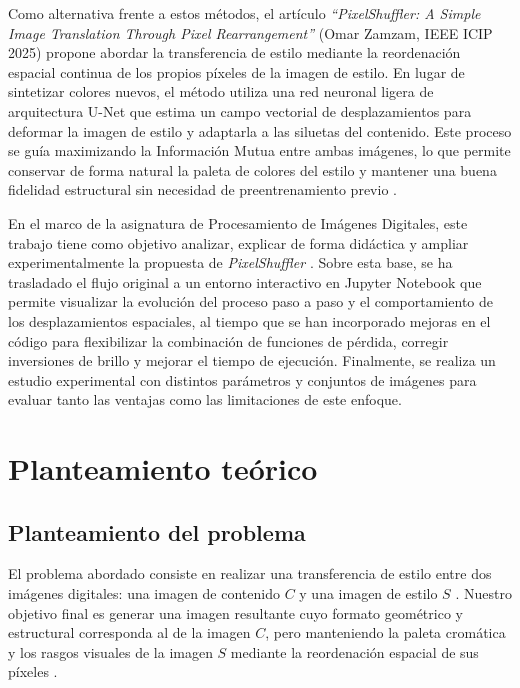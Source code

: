 \documentclass[a4paper]{article}
\begin{document}
\vspace{0.3cm}

\noindent Como alternativa frente a estos métodos, el artículo \textit{``PixelShuffler: A Simple Image Translation Through Pixel Rearrangement''} (Omar Zamzam, IEEE ICIP 2025) \cite{zamzam2025pixelshuffler} propone abordar la transferencia de estilo mediante la reordenación espacial continua de los propios píxeles de la imagen de estilo. En lugar de sintetizar colores nuevos, el método utiliza una red neuronal ligera de arquitectura U-Net \cite{ronneberger2015unet} que estima un campo vectorial de desplazamientos para deformar la imagen de estilo y adaptarla a las siluetas del contenido. Este proceso se guía maximizando la Información Mutua entre ambas imágenes, lo que permite conservar de forma natural la paleta de colores del estilo y mantener una buena fidelidad estructural sin necesidad de preentrenamiento previo \cite{zamzam2025pixelshuffler}.

\vspace{0.3cm}

\noindent En el marco de la asignatura de Procesamiento de Imágenes Digitales, este trabajo tiene como objetivo analizar, explicar de forma didáctica y ampliar experimentalmente la propuesta de \mbox{\textit{PixelShuffler}} \cite{zamzam2025pixelshuffler}. Sobre esta base, se ha trasladado el flujo original a un entorno interactivo en Jupyter Notebook que permite visualizar la evolución del proceso paso a paso y el comportamiento de los desplazamientos espaciales, al tiempo que se han incorporado mejoras en el código para flexibilizar la combinación de funciones de pérdida, corregir inversiones de brillo y mejorar el tiempo de ejecución. Finalmente, se realiza un estudio experimental con distintos parámetros y conjuntos de imágenes para evaluar tanto las ventajas como las limitaciones de este enfoque.

\section{Planteamiento teórico}

\subsection{Planteamiento del problema}

\noindent El problema abordado consiste en realizar una transferencia de estilo entre dos imágenes digitales: una imagen de contenido $C$ y una imagen de estilo $S$ \cite{gatys2015neural, zamzam2025pixelshuffler}. Nuestro objetivo final es generar una imagen resultante cuyo formato geométrico y estructural corresponda al de la imagen $C$, pero manteniendo la paleta cromática y los rasgos visuales de la imagen $S$ mediante la reordenación espacial de sus píxeles \cite{zamzam2025pixelshuffler}.
\end{document}
